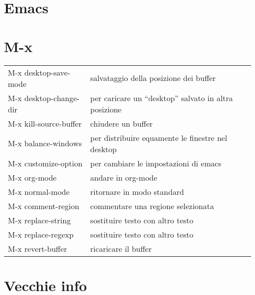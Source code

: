 \documentclass{article}
\begin{document}
\setmainfont{Arial Narrow}

\section{Emacs}

\section{M-x}

\begin{tabular}{ll}
  M-x desktop-save-mode & salvataggio della posizione dei buffer\\
  M-x desktop-change-dir & per caricare un ``desktop'' salvato in altra posizione\\
  M-x kill-source-buffer & chiudere un buffer\\
  M-x balance-windows & per distribuire equamente le finestre nel desktop\\
  M-x customize-option & per cambiare le impostazioni di emacs\\
  M-x org-mode & andare in org-mode\\
  M-x normal-mode & ritornare in modo standard\\
  M-x comment-region & commentare una regione selezionata\\
  M-x replace-string & sostituire testo con altro testo\\
  M-x replace-regexp & sostituire testo con altro testo\\
  M-x revert-buffer & ricaricare il buffer\\
\end{tabular}

\section{Vecchie info}
\end{document}
